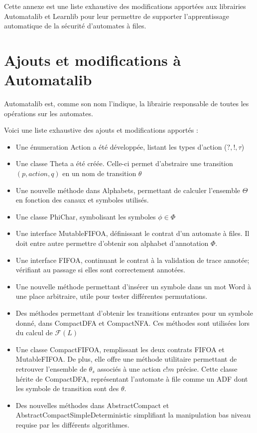 Cette annexe est une liste exhaustive des modifications apportées aux librairies Automatalib et Learnlib pour leur permettre de supporter l'apprentissage automatique de la sécurité d'automates à files.

\section{Ajouts et modifications à Automatalib}

Automatalib est, comme son nom l'indique, la librairie responsable de toutes les opérations sur les automates.

Voici une liste exhaustive des ajouts et modifications apportés :
\begin{itemize}
  \item Une énumeration Action a été développée, listant les types d'action ($?,!,\tau$)
  \item Une classe Theta a été créée. Celle-ci permet d'abstraire une transition $(p,action,q)$ en un nom de transition $\theta$
  \item Une nouvelle méthode dans Alphabets, permettant de calculer l'ensemble $\Theta$ en fonction des canaux et symboles utilisés.
  \item Une classe PhiChar, symbolisant les symboles $\phi\in\Phi$
  \item Une interface MutableFIFOA, définissant le contrat d'un automate à files. Il doit entre autre permettre d'obtenir son alphabet d'annotation $\Phi$.
  \item Une interface FIFOA, continuant le contrat à la validation de trace annotée; vérifiant au passage si elles sont correctement annotées.
  \item Une nouvelle méthode permettant d'insérer un symbole dans un mot Word à une place arbitraire, utile pour tester différentes permutations.
  \item Des méthodes permettant d'obtenir les transitions entrantes pour un symbole donné, dans CompactDFA et CompactNFA. Ces méthodes sont utilisées lors du calcul de $\mathcal{F}(L)$
  \item Une classe CompactFIFOA, remplissant les deux contrats FIFOA et MutableFIFOA. De plus, elle offre une méthode utilitaire permettant de retrouver l'ensemble de $\theta_s$ associés à une action $c!m$ précise. Cette classe hérite de CompactDFA, représentant l'automate à file comme un ADF dont les symbole de transition sont des $\theta$.
  \item Des nouvelles méthodes dans AbstractCompact et AbstractCompactSimpleDeterministic simplifiant la manipulation bas niveau requise par les différents algorithmes.

\end{itemize}
